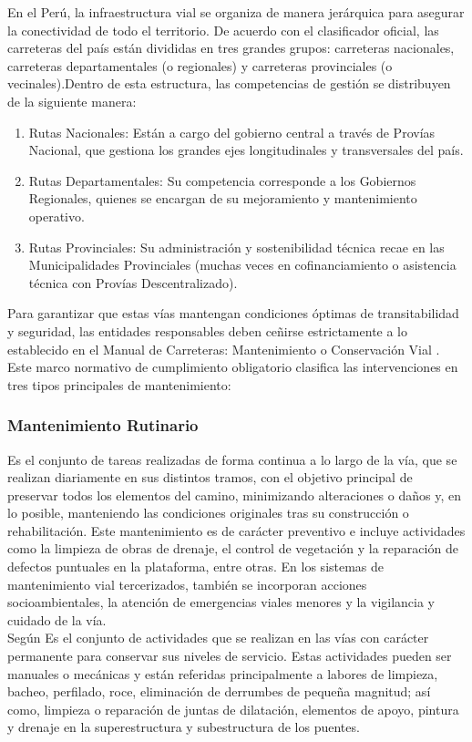 En el Perú, la infraestructura vial se organiza de manera jerárquica para asegurar la conectividad de todo el territorio. De acuerdo con el clasificador oficial, las carreteras del país están divididas en tres grandes grupos: carreteras nacionales, carreteras departamentales (o regionales) y carreteras provinciales (o vecinales).Dentro de esta estructura, las competencias de gestión se distribuyen de la siguiente manera:
\begin{enumerate}
	\item Rutas Nacionales: Están a cargo del gobierno central a través de Provías Nacional, que gestiona los grandes ejes longitudinales y transversales del país.
	\item Rutas Departamentales: Su competencia corresponde a los Gobiernos Regionales, quienes se encargan de su mejoramiento y mantenimiento operativo.
	\item Rutas Provinciales: Su administración y sostenibilidad técnica recae en las Municipalidades Provinciales (muchas veces en cofinanciamiento o asistencia técnica con Provías Descentralizado).
\end{enumerate}

Para garantizar que estas vías mantengan condiciones óptimas de transitabilidad y seguridad, las entidades responsables deben ceñirse estrictamente a lo establecido en el Manual de Carreteras: Mantenimiento o Conservación Vial \textcite{ManualCarreteras2018}. Este marco normativo de cumplimiento obligatorio clasifica las intervenciones en tres tipos principales de mantenimiento:

\subsubsection{Mantenimiento Rutinario}

Es el conjunto de tareas realizadas de forma continua a lo largo de la vía, que se realizan diariamente en sus distintos tramos, con el objetivo principal de preservar todos los elementos del camino, minimizando alteraciones o daños y, en lo posible, manteniendo las condiciones originales tras su construcción o rehabilitación. Este mantenimiento es de carácter preventivo e incluye actividades como la limpieza de obras de drenaje, el control de vegetación y la reparación de defectos puntuales en la plataforma, entre otras. En los sistemas de mantenimiento vial tercerizados, también se incorporan acciones socioambientales, la atención de emergencias viales menores y la vigilancia y cuidado de la vía.\\
\noindent Según  \textcite{ManualCarreteras2018} Es el conjunto de actividades que se realizan en las vías con carácter permanente para conservar sus niveles de servicio. Estas actividades pueden ser manuales o mecánicas y están referidas principalmente a labores de limpieza, bacheo, perfilado, roce, eliminación de derrumbes de pequeña magnitud; así como, limpieza o reparación de juntas de dilatación, elementos de apoyo, pintura y drenaje en la superestructura y subestructura de los puentes.

